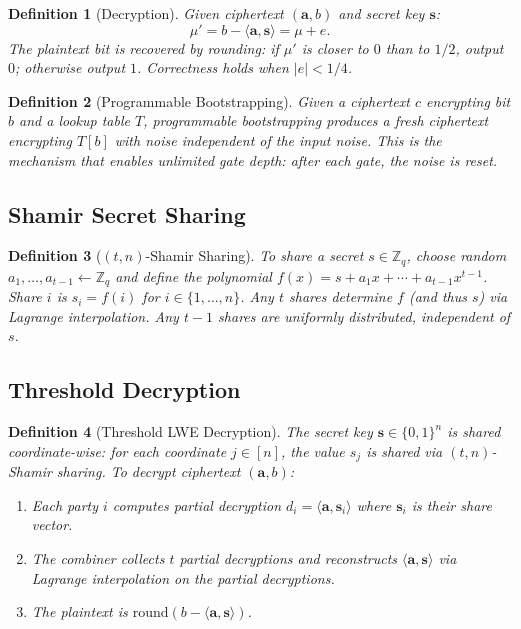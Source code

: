 \documentclass[11pt,a4paper]{article}
\newtheorem{definition}{Definition}[section]
\begin{document}
\begin{definition}[Decryption]
Given ciphertext $(\mathbf{a}, b)$ and secret key $\mathbf{s}$:
\[
  \mu' = b - \langle \mathbf{a}, \mathbf{s} \rangle = \mu + e.
\]
The plaintext bit is recovered by rounding: if $\mu'$ is closer to $0$
than to $1/2$, output $0$; otherwise output $1$.  Correctness holds when
$|e| < 1/4$.
\end{definition}

\begin{definition}[Programmable Bootstrapping]
Given a ciphertext $c$ encrypting bit $b$ and a lookup table $T$,
programmable bootstrapping produces a fresh ciphertext encrypting $T[b]$
with noise independent of the input noise.  This is the mechanism that
enables unlimited gate depth: after each gate, the noise is reset.
\end{definition}

\subsection{Shamir Secret Sharing}

\begin{definition}[$(t, n)$-Shamir Sharing]
\label{def:shamir}
To share a secret $s \in \mathbb{Z}_q$, choose random
$a_1, \ldots, a_{t-1} \leftarrow \mathbb{Z}_q$ and define the polynomial
$f(x) = s + a_1 x + \cdots + a_{t-1} x^{t-1}$.
Share $i$ is $s_i = f(i)$ for $i \in \{1, \ldots, n\}$.
Any $t$ shares determine $f$ (and thus $s$) via Lagrange interpolation.
Any $t-1$ shares are uniformly distributed, independent of $s$.
\end{definition}

\subsection{Threshold Decryption}

\begin{definition}[Threshold LWE Decryption]
\label{def:threshold-dec}
The secret key $\mathbf{s} \in \{0,1\}^n$ is shared coordinate-wise:
for each coordinate $j \in [n]$, the value $s_j$ is shared via
$(t, n)$-Shamir sharing.  To decrypt ciphertext $(\mathbf{a}, b)$:
\begin{enumerate}[nosep]
  \item Each party $i$ computes partial decryption
        $d_i = \langle \mathbf{a}, \mathbf{s}_i \rangle$ where
        $\mathbf{s}_i$ is their share vector.
  \item The combiner collects $t$ partial decryptions and reconstructs
        $\langle \mathbf{a}, \mathbf{s} \rangle$ via Lagrange
        interpolation on the partial decryptions.
  \item The plaintext is $\text{round}(b - \langle \mathbf{a},
        \mathbf{s} \rangle)$.
\end{enumerate}
\end{definition}
\end{document}
